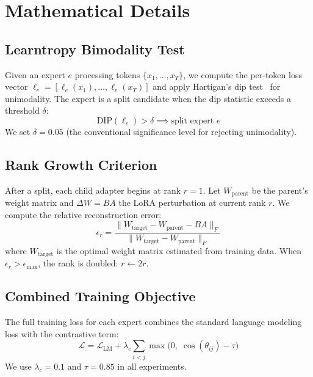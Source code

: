 \documentclass{article}
\begin{document}
\section{Mathematical Details}
\label{app:math}

\subsection{Learntropy Bimodality Test}

Given an expert $e$ processing tokens $\{x_1, \ldots, x_T\}$, we compute the
per-token loss vector $\ell_e = [\ell_e(x_1), \ldots, \ell_e(x_T)]$ and apply
Hartigan's dip test~\cite{hartigan1985dip} for unimodality. The expert is a
split candidate when the dip statistic exceeds a threshold $\delta$:
\begin{equation}
    \text{DIP}(\ell_e) > \delta \implies \text{split expert } e
\end{equation}
We set $\delta = 0.05$ (the conventional significance level for rejecting
unimodality).

\subsection{Rank Growth Criterion}

After a split, each child adapter begins at rank $r = 1$. Let
$W_{\text{parent}}$ be the parent's weight matrix and $\Delta W = BA$ the LoRA
perturbation at current rank $r$. We compute the relative reconstruction error:
\begin{equation}
    \epsilon_r = \frac{\|W_{\text{target}} - W_{\text{parent}} - BA\|_F}{\|W_{\text{target}} - W_{\text{parent}}\|_F}
\end{equation}
where $W_{\text{target}}$ is the optimal weight matrix estimated from training
data. When $\epsilon_r > \epsilon_{\max}$, the rank is doubled: $r \leftarrow 2r$.

\subsection{Combined Training Objective}

The full training loss for each expert combines the standard language modeling
loss with the contrastive term:
\begin{equation}
    \mathcal{L} = \mathcal{L}_{\text{LM}} + \lambda_c \sum_{i < j} \max\bigl(0,\; \cos(\theta_{ij}) - \tau\bigr)
\end{equation}
We use $\lambda_c = 0.1$ and $\tau = 0.85$ in all experiments.
\end{document}
